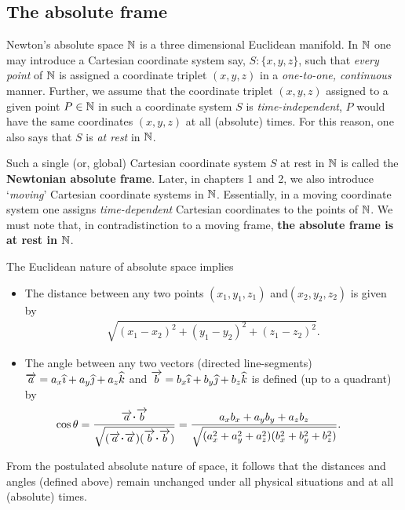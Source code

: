 \subsection{The absolute frame}

Newton's absolute space $\mathbb{N}$ is a three 
dimensional Euclidean manifold.  In $\mathbb{N}$ one may 
introduce a Cartesian coordinate system say, 
$S:\{x,y,z\}$,  such that 
\textsl{every point} of $\mathbb{N}$ is assigned a 
coordinate triplet $(x,y,z)$ in a \textsl{one-to-one, 
continuous} manner.  Further, we assume that the 
coordinate triplet $(x,y,z)$ assigned to a given point 
$P\in \mathbb{N}$ in such a coordinate system $S$ is 
\textsl{time-independent}, \ie $P$ would have the same 
coordinates $(x,y,z)$ at all (absolute) times. For this 
reason, one also says that $S$ is \textsl{at rest} in 
$\mathbb{N}$.

Such a single (or, global) Cartesian coordinate 
system $S$ at rest in $\mathbb{N}$ is called the 
\textbf{Newtonian absolute frame}. 
Later, in chapters 1 and 2, we also introduce 
`\textsl{moving}' Cartesian coordinate systems in 
$\mathbb{N}$. Essentially, in a moving coordinate system 
one  assigns \textsl{time-dependent} Cartesian 
coordinates to the points of $\mathbb{N}$. We must note 
that, in contradistinction to a moving frame, 
\textbf{the absolute frame is at rest in $\mathbb{N}$}. 

\noindent The Euclidean nature of absolute space 
implies
\begin{itemize}
\item The distance between any two points $(x_1, y_1, 
z_1)$ 
and\lbk $(x_2, y_2, z_2)$ is given by
\begin{align}\label{gr.1}
\sqrt{(x_1-x_2)^2+(y_1-y_2)^2+(z_1-z_2)^2}.
\end{align}
\item The angle between any two vectors (directed 
line-segments) $\overrightarrow{a}=a_x{\widehat{\imath}}+a_y{\widehat{\jmath}}+a_z{\widehat{k}}$ and 
$\overrightarrow{b} =b_x{\widehat{\imath}} + b_y{\widehat{\jmath}} + b_z{\widehat{k}}$ is defined (up 
to a 
quadrant) by
\begin{align} \label{gr.2}
\hspace*{-6mm}\cos\theta&=\frac{\vec{a}\dotp\vec{b}}
{\sqrt{(\vec{a}\dotp\vec{a})(\vec{b}\dotp\vec{b})}} =  
 \frac{a_xb_x+a_yb_ y+a_zb_z}
{\sqrt{ (a_x^2+a_y^2+a_z^2)(b_x^2+b_y^2+b_z^2) }}.
\end{align}
\end{itemize}
From the postulated absolute nature of space, it 
follows that the distances and angles (defined above) 
remain unchanged under all physical situations and at 
all (absolute) times.

